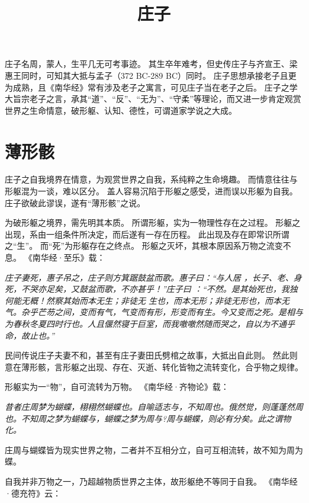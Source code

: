 \documentclass[11pt]{article}
\title{庄子}
\date{}
\begin{document}
  \maketitle

  \linenumbers

庄子名周，蒙人，生平几无可考事迹。
其生卒年难考，但史传庄子与齐宣王、梁惠王同时，可知其大抵与孟子（372 BC-289 BC）同时。
庄子思想承接老子且更为成熟，且《南华经》常有涉及老子之寓言，可见庄子当在老子之后。
庄子之学大旨宗老子之言，承其“道”、“反”、“无为”、“守柔”等理论，而又进一步肯定观赏世界之生命情意，破形躯、认知、德性，可谓道家学说之大成。

\section{薄形骸}
庄子之自我境界在情意，为观赏世界之自我，系纯粹之生命境趣。
而情意往往与形躯混为一谈，难以区分。
盖人容易沉陷于形躯之感受，进而误以形躯为自我。
庄子欲破此谬误，遂有“薄形骸”之说。

\par

为破形躯之境界，需先明其本质。
所谓形躯，实为一物理性存在之过程。
形躯之出现，系由一组条件所决定，而后遂有一存在历程。
此出现及存在即常识所谓之“生”。
而“死”为形躯存在之终点。
形躯之灭坏，其根本原因系万物之流变不息。
《南华经·至乐》载：

\textit{庄子妻死，惠子吊之，庄子则方箕踞鼓盆而歌。惠子曰：“与人居 ，长子、老、身死，不哭亦足矣，又鼓盆而歌，不亦甚乎！”庄子曰 ：“不然。是其始死也，我独何能无概！然察其始而本无生；非徒无 生也，而本无形；非徒无形也，而本无气。杂乎芒芴之间，变而有气，气变而有形，形变而有生。今又变而之死。是相与为春秋冬夏四时行也。人且偃然寝于巨室，而我噭噭然随而哭之，自以为不通乎命，故止也。”}

民间传说庄子夫妻不和，甚至有庄子妻田氏劈棺之故事，大抵出自此则。
然此则意在薄形骸，言形躯之出现、存在、灭逝、转化皆物之流转变化，合乎物之规律。

\par

形躯实为一“物”，自可流转为万物。
《南华经·齐物论》载：

\textit{昔者庄周梦为蝴蝶，栩栩然蝴蝶也。自喻适志与，不知周也。俄然觉，则蓬蓬然周也。不知周之梦为蝴蝶与，蝴蝶之梦为周与?周与蝴蝶，则必有分矣。此之谓物化。}

庄周与蝴蝶皆为现实世界之物，二者并不互相分立，自可互相流转，故不知为周为蝶。

\par

自我并非万物之一，乃超越物质世界之主体，故形躯绝不等同于自我。
《南华经·德充符》云：
\end{document}
